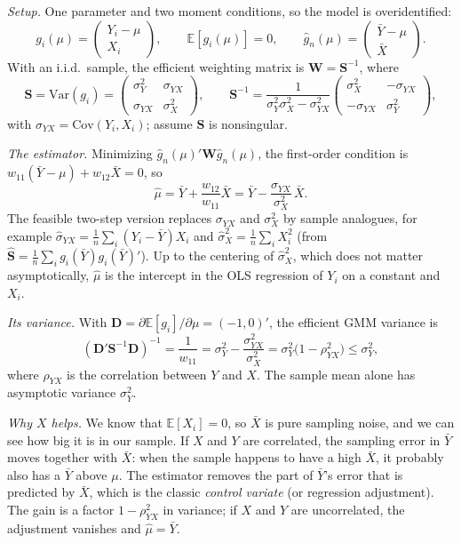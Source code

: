 \documentclass[11pt]{article}
\newcommand{\E}{\mathbb{E}}
\newcommand{\Var}{\mathrm{Var}}
\newcommand{\Cov}{\mathrm{Cov}}
\newcommand{\symbf}[1]{\boldsymbol{#1}}
\begin{document}
\emph{Setup.} One parameter and two moment conditions, so the model is overidentified:
\[
g_i(\mu)=\begin{pmatrix}Y_i-\mu\\X_i\end{pmatrix},\qquad\E[g_i(\mu)]=0,\qquad\hat g_n(\mu)=\begin{pmatrix}\bar Y-\mu\\\bar X\end{pmatrix}.
\]
With an i.i.d.\ sample, the efficient weighting matrix is $\symbf W=\symbf S^{-1}$, where
\[
\symbf S=\Var(g_i)=\begin{pmatrix}\sigma_Y^2&\sigma_{YX}\\\sigma_{YX}&\sigma_X^2\end{pmatrix},\qquad\symbf S^{-1}=\frac1{\sigma_Y^2\sigma_X^2-\sigma_{YX}^2}\begin{pmatrix}\sigma_X^2&-\sigma_{YX}\\-\sigma_{YX}&\sigma_Y^2\end{pmatrix},
\]
with $\sigma_{YX}=\Cov(Y_i,X_i)$; assume $\symbf S$ is nonsingular.

\emph{The estimator.} Minimizing $\hat g_n(\mu)'\symbf W\hat g_n(\mu)$, the first-order condition is $w_{11}(\bar Y-\mu)+w_{12}\bar X=0$, so
\[
\hat\mu=\bar Y+\frac{w_{12}}{w_{11}}\bar X=\bar Y-\frac{\sigma_{YX}}{\sigma_X^2}\,\bar X .
\]
The feasible two-step version replaces $\sigma_{YX}$ and $\sigma_X^2$ by sample analogues, for example $\hat\sigma_{YX}=\frac1n\sum_i(Y_i-\bar Y)X_i$ and $\hat\sigma_X^2=\frac1n\sum_iX_i^2$ (from $\hat{\symbf S}=\frac1n\sum_ig_i(\bar Y)g_i(\bar Y)'$). Up to the centering of $\hat\sigma_X^2$, which does not matter asymptotically, $\hat\mu$ is the intercept in the OLS regression of $Y_i$ on a constant and $X_i$.

\emph{Its variance.} With $\symbf D=\partial\E[g_i]/\partial\mu=(-1,0)'$, the efficient GMM variance is
\[
(\symbf D'\symbf S^{-1}\symbf D)^{-1}=\frac1{w_{11}}=\sigma_Y^2-\frac{\sigma_{YX}^2}{\sigma_X^2}=\sigma_Y^2\big(1-\rho_{YX}^2\big)\le\sigma_Y^2,
\]
where $\rho_{YX}$ is the correlation between $Y$ and $X$. The sample mean alone has asymptotic variance $\sigma_Y^2$.

\emph{Why $X$ helps.} We know that $\E[X_i]=0$, so $\bar X$ is pure sampling noise, and we can see how big it is in our sample. If $X$ and $Y$ are correlated, the sampling error in $\bar Y$ moves together with $\bar X$: when the sample happens to have a high $\bar X$, it probably also has a $\bar Y$ above $\mu$. The estimator removes the part of $\bar Y$'s error that is predicted by $\bar X$, which is the classic \emph{control variate} (or regression adjustment). The gain is a factor $1-\rho_{YX}^2$ in variance; if $X$ and $Y$ are uncorrelated, the adjustment vanishes and $\hat\mu=\bar Y$.
\end{document}
